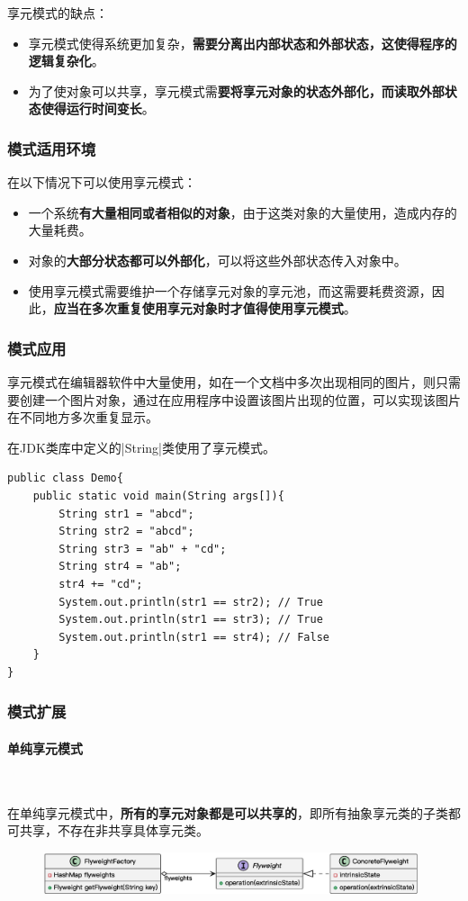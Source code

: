 享元模式的缺点：
\begin{itemize}
    \item 享元模式使得系统更加复杂，\textbf{需要分离出内部状态和外部状态，这使得程序的逻辑复杂化}。
    \item 为了使对象可以共享，享元模式需\textbf{要将享元对象的状态外部化，而读取外部状态使得运行时间变长}。
\end{itemize}

\subsubsection{模式适用环境}
在以下情况下可以使用享元模式：
\begin{itemize}
    \item 一个系统\textbf{有大量相同或者相似的对象}，由于这类对象的大量使用，造成内存的大量耗费。
    \item 对象的\textbf{大部分状态都可以外部化}，可以将这些外部状态传入对象中。
    \item 使用享元模式需要维护一个存储享元对象的享元池，而这需要耗费资源，因此，\textbf{应当在多次重复使用享元对象时才值得使用享元模式}。
\end{itemize}

\subsubsection{模式应用}
 享元模式在编辑器软件中大量使用，如在一个文档中多次出现相同的图片，则只需要创建一个图片对象，通过在应用程序中设置该图片出现的位置，可以实现该图片在不同地方多次重复显示。

 在JDK类库中定义的\sverb|String|\;类使用了享元模式。
\begin{lstlisting}
public class Demo{
    public static void main(String args[]){
        String str1 = "abcd";
        String str2 = "abcd";
        String str3 = "ab" + "cd";
        String str4 = "ab";
        str4 += "cd";
        System.out.println(str1 == str2); // True
        System.out.println(str1 == str3); // True
        System.out.println(str1 == str4); // False
    }
}
\end{lstlisting}

\subsubsection{模式扩展}

\paragraph*{单纯享元模式}~{} \par
在单纯享元模式中，\textbf{所有的享元对象都是可以共享的}，即所有抽象享元类的子类都可共享，不存在非共享具体享元类。
\begin{figure}[H]
    \vspace{-0.5em}
	\centering
	\includegraphics[width=0.98\textwidth]{images/享元模式拓展1.eps}
    \vspace{-1em}
\end{figure}

